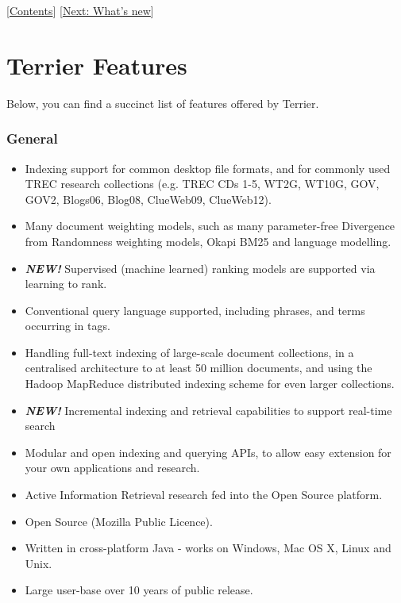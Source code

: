 {[}\href{index.html}{Contents}{]} {[}\href{whats_new.html}{Next: What's
new}{]}\\

\section{Terrier Features}\label{terrier-features}

Below, you can find a succinct list of features offered by Terrier.

\subsubsection{General}\label{general}

\begin{itemize}
\tightlist
\item
  Indexing support for common desktop file formats, and for commonly
  used TREC research collections (e.g. TREC CDs 1-5, WT2G, WT10G, GOV,
  GOV2, Blogs06, Blog08, ClueWeb09, ClueWeb12).
\item
  Many document weighting models, such as many parameter-free Divergence
  from Randomness weighting models, Okapi BM25 and language modelling.
\item
  \textbf{\emph{NEW!}} Supervised (machine learned) ranking models are
  supported via learning to rank.
\item
  Conventional query language supported, including phrases, and terms
  occurring in tags.
\item
  Handling full-text indexing of large-scale document collections, in a
  centralised architecture to at least 50 million documents, and using
  the Hadoop MapReduce distributed indexing scheme for even larger
  collections.
\item
  \emph{\textbf{NEW!}} Incremental indexing and retrieval capabilities
  to support real-time search
\item
  Modular and open indexing and querying APIs, to allow easy extension
  for your own applications and research.
\item
  Active Information Retrieval research fed into the Open Source
  platform.
\item
  Open Source (Mozilla Public Licence).
\item
  Written in cross-platform Java - works on Windows, Mac OS X, Linux and
  Unix.
\item
  Large user-base over 10 years of public release.
\end{itemize}

